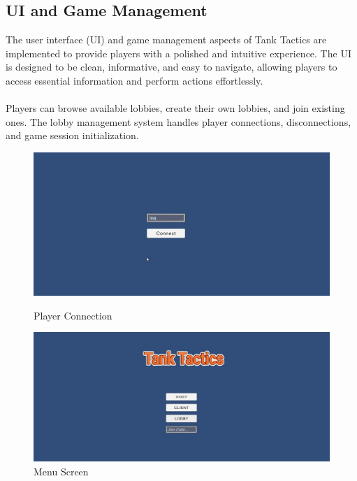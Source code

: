 \subsection{UI and Game Management}
The user interface (UI) and game management aspects of Tank Tactics are implemented to provide players with a polished and intuitive experience. The UI is designed to be clean, informative, and easy to navigate, allowing players to access essential information and perform actions effortlessly.
\\
\noindent
\\
Players can browse available lobbies, create their own lobbies, and join existing ones. The lobby management system handles player connections, disconnections, and game session initialization.
\begin{figure}[h]
    \centering
    \begin{minipage}{0.49\textwidth}
    \centering
    \includegraphics[width=1\textwidth]{figures/Connection.png}
    \caption{Player Connection}
    \label{fig:player_connection}
    \end{minipage}
    \hfill
    \begin{minipage}{0.49\textwidth}
    \centering
    \includegraphics[width=1\textwidth]{figures/MENU.png}
    \caption{Menu Screen}
    \label{fig:player_menu}
    \end{minipage}
\end{figure}
